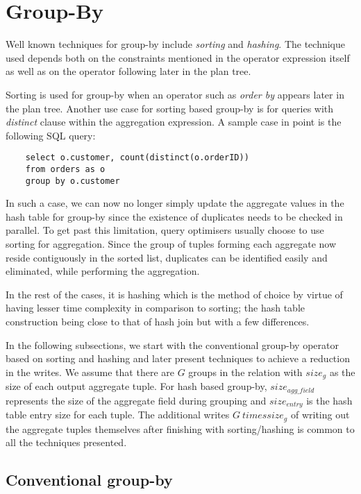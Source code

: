 \section{Group-By}%
\label{gby}

Well known techniques for group-by include \textit{sorting} and \textit{hashing}. The technique used depends both on the constraints mentioned in the operator expression itself as well as on the operator following later in the plan tree.


Sorting is used for group-by when an operator such as \textit{order by} appears later in the plan tree. Another use case for sorting based group-by is for queries with \textit{distinct} clause within the aggregation expression. A sample case in point is the following SQL query:
\begin{verbatim}
	select o.customer, count(distinct(o.orderID))
	from orders as o 
	group by o.customer
\end{verbatim}


In such a case, we can now no longer simply update the aggregate values in the hash table for group-by since the existence of duplicates needs to be checked in parallel. To get past this limitation, query optimisers usually choose to use sorting for aggregation. Since the group of tuples forming each aggregate now reside contiguously in the sorted list, duplicates can be identified easily and eliminated, while performing the aggregation.

In the rest of the cases, it is hashing which is the method of choice by virtue of having lesser time complexity in comparison to sorting; the hash table construction being close to that of hash join but with a few differences.

In the following subsections, we start with the conventional group-by operator based on sorting and hashing and later present techniques to achieve a reduction in the writes. We assume that there are $G$ groups in the relation with $size_g$ as the size of each output aggregate tuple. For hash based group-by, $size_{agg\_field}$ represents the size of the aggregate field during grouping and $size_{entry}$ is the hash table entry size for each tuple. The additional writes $G \ times size_g$ of writing out the aggregate tuples themselves after finishing with sorting/hashing  is common to all the techniques presented.

\subsection{Conventional group-by}


